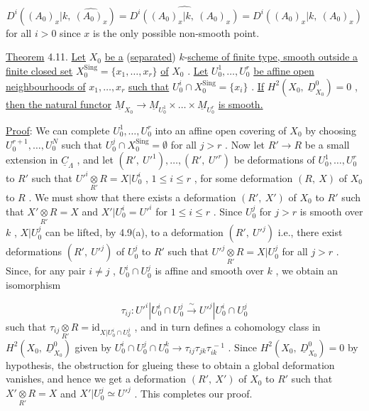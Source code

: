 $$D^i((A_0)_x|k,\ \widehat{(A_0)_x}) = \widehat{D^i((A_0)_x|k,\ (A_0)_x)} = D^i((A_0)_x|k,\ (A_0)_x)$$
for all  $i > 0$  since  $x$  is the only possible non-smooth point.

\underline{Theorem} 4.11.  \underline{Let}  $X_0$  \underline{be a} (\underline{separated}) $k$-\underline{scheme of finite type, smooth outside a finite closed set}  $X_0^{\mathrm{Sing}} = \{x_1,\dots,x_r\}$  \underline{of}  $X_0$ . \underline{Let}  $U_0^1,\dots,U_0^r$  \underline{be affine open neighbourhoods of}  $x_1,\dots,x_r$  \underline{such that}  $U_0^i \cap X_0^{\mathrm{Sing}} = \{x_i\}$ . \underline{If} $H^2(X_0,\ \underline{D}^0_{X_0}) = 0$ , \underline{then the natural functor}  $\underline{M}_{X_0} \to \underline{M}_{U_0^1} \times\dots\times \underline{M}_{U_0^r}$   \underline{is smooth.}

\underline{Proof}: We can complete  $U_0^1, \dots ,U_0^r$  into an affine open covering of  $X_0$  by choosing $U_0^{r+1},\dots,U_0^N$  such that   $U_0^j \cap X_0^{\mathrm{Sing}} = \emptyset$  for all  $j > r$ . Now let $R' \to R$  be a small extension in  $\underline{C}_{\Lambda}$ , and let  $(R',\ U'^1),\dots,(R',\ U'^r)$  be deformations of  $U_0^1,\dots,U_0^r$  to  $R'$  such that  $U'^i \underset{R'}{\otimes} R = X|U_0^i$ ,  $1 \le i \le r$ , for
some deformation  $(R,\ X)$  of  $X_0$  to  $R$ . We must show that there exists a deformation  $(R',\ X')$  of  $X_0$  to  $R'$  such that  $X' \underset{R'}{\otimes} R = X$  and  $X'|U_0^i = U'^i$  for $1 \le i \le r$ . Since  $U_0^j$  for  $j > r$  is smooth over  $k$ ,  $X|U_0^j$  can be lifted, by 4.9(a), to a deformation  $(R',\ U'^j)$  i.e., there exist deformations  $(R',\ U'^j)$ of  $U_0^j$  to  $R'$  such that  $U'^j \underset{R'}{\otimes} R = X|U_0^j$  for all  $j > r$ . Since, for any pair $i \ne j$ ,  $U_0^i \cap U_0^j$  is affine and smooth over  $k$ , we obtain an isomorphism

$$\tau_{ij} : U'^i|U_0^i \cap U_0^j \xrightarrow{\ \sim\ } U'^j|U_0^i \cap U_0^j$$
such that  $\tau_{ij} \underset{R'}{\otimes} R = \mathrm{id}_{X|U_0^i \cap U_0^j}$ , and in turn defines a cohomology class in $H^2(X_0,\ \underline{D}^0_{X_0})$  given by  $U_0^i \cap U_0^j \cap U_0^k \to \tau_{ij}\tau_{jk}\tau_{ik}^{\ -1}$ . Since  $H^2(X_0,\ \underline{D}^0_{X_0}) = 0$  by hypothesis, the obstruction for glueing these to obtain a global deformation vanishes, and hence we get a deformation  $(R',\ X')$  of  $X_0$  to  $R'$  such that $X' \underset{R'}{\otimes} R = X$  and  $X'|U_0^j \simeq U'^j$ . This completes our proof.

